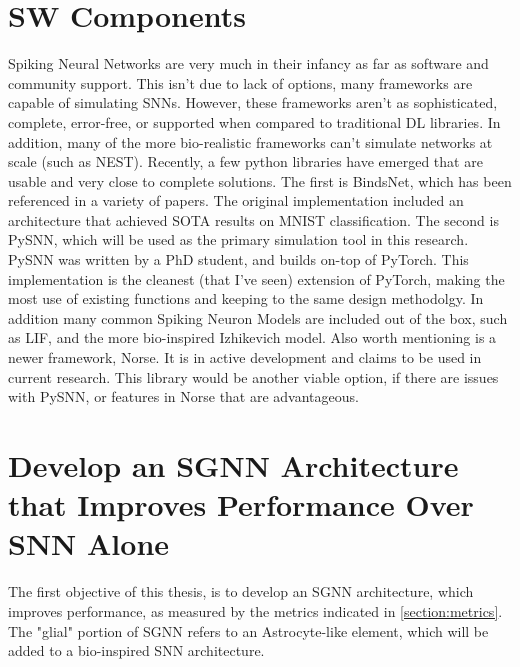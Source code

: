     \section{SW Components}
    Spiking Neural Networks are very much in their infancy as far as software and community support. This isn't due to lack of options, many frameworks are capable of simulating SNNs. However, these frameworks aren't as sophisticated, complete, error-free, or supported when compared to traditional DL libraries. In addition, many of the more bio-realistic frameworks can't simulate networks at scale (such as NEST). Recently, a few python libraries have emerged that are usable and very close to complete solutions. The first is BindsNet, which has been referenced in a variety of papers. The original implementation included an architecture that achieved SOTA results on MNIST classification. The second is PySNN, which will be used as the primary simulation tool in this research. PySNN was written by a PhD student, and builds on-top of PyTorch. This implementation is the cleanest (that I've seen) extension of PyTorch, making the most use of existing functions and keeping to the same design methodolgy. In addition many common Spiking Neuron Models are included out of the box, such as LIF, and the more bio-inspired Izhikevich model. Also worth mentioning is a newer framework, Norse. It is in active development and claims to be used in current research. This library would be another viable option, if there are issues with PySNN, or features in Norse that are advantageous.
    
    \section{Develop an SGNN Architecture that Improves Performance Over SNN Alone}
    The first objective of this thesis, is to develop an SGNN architecture, which improves performance, as measured by the metrics indicated in \ref{section:metrics}. The "glial" portion of SGNN refers to an Astrocyte-like element, which will be added to a bio-inspired SNN architecture.
    
